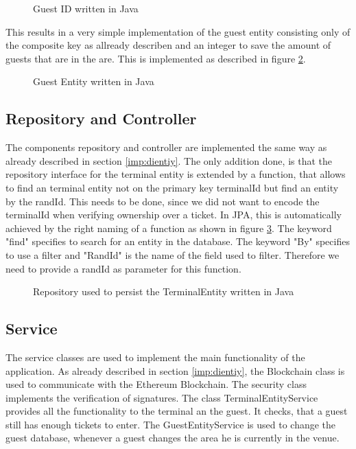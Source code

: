 \begin{figure}[H]
    
    \caption{Guest ID written in Java}
    \label{code:GuestID}
\end{figure}


This results in a very simple implementation of the guest entity consisting only of the composite key as allready describen and an integer to save the amount of guests that are in the are. This is implemented as described in figure \ref{code:GuestEntity}.

\begin{figure}[H]
    
    \caption{Guest Entity written in Java}
    \label{code:GuestEntity}
\end{figure}

\subsection{Repository and Controller}

The components repository and controller are implemented the same way as already described in section \ref{imp:dientiy}. The only addition done, is that the repository interface for the terminal entity is extended by a function, that allows to find an terminal entity not on the primary key terminalId but find an entity by the randId. This needs to be done, since we did not want to encode the terminalId when verifying ownership over a ticket. In JPA, this is automatically achieved by the right naming of a function as shown in figure \ref{code:repo:terminal}. The keyword "find" specifies to search for an entity in the database. The keyword "By" specifies to use a filter and "RandId" is the name of the field used to filter. Therefore we need to provide a randId as parameter for this function.  

\begin{figure}[H]
    
    \caption{Repository used to persist the TerminalEntity written in Java}
    \label{code:repo:terminal}
\end{figure}

\subsection{Service}

The service classes are used to implement the main functionality of the application. As already described in section \ref{imp:dientiy}, the Blockchain class is used to communicate with the Ethereum Blockchain. The security class implements the verification of signatures.
The class TerminalEntityService provides all the functionality to the terminal an the guest. It checks, that a guest still has enough tickets to enter. 
The GuestEntityService is used to change the guest database, whenever a guest changes the area he is currently in the venue. 

